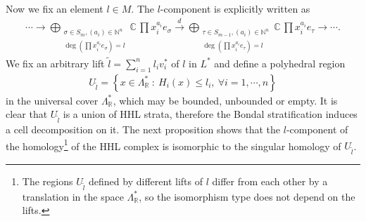 \documentclass[11pt,reqno]{amsart}
\def\C {{\mathbb C}}
\def\R {{\mathbb R}}
\theoremstyle{definition}
\numberwithin{equation}{section}
\begin{document}
Now we fix an element $l\in M$. The $l$-component is explicitly written as
\begin{align}\label{eq-l-complex}
    \cdots\rightarrow\bigoplus_{\substack{ \sigma\in S_m, (a_i)\in\mathbb{N}^n \\ \deg(\prod x_i^{a_i} e_{\sigma}) = l}} \C \, \prod x_i^{a_i} e_{\sigma} \xrightarrow{d} \bigoplus_{\substack{ \tau\in S_{m-1}, (a_i)\in\mathbb{N}^n\\ \deg(\prod x_i^{a_i} e_{\tau}) = l}} \C \, \prod x_i^{a_i} e_{\tau}\rightarrow\cdots.
\end{align}
We fix an arbitrary lift $\widetilde{l} = \sum_{i=1}^n l_i v_i^*$ of $l$ in $L^*$ and define a polyhedral region 
\begin{align*}
    U_{\widetilde{l}} = \left\{ x\in \Lambda^*_{\R}\ :\ H_i(x) \leq l_i,\ \forall i=1,\cdots,n\right\}
\end{align*}
in the universal cover $\Lambda^*_{\R}$, which may be bounded, unbounded or empty. It is clear that $U_{\widetilde{l}}$ is a union of HHL strata, therefore the Bondal stratification induces a cell decomposition on it. The next proposition shows that the $l$-component of the homology\footnote{The regions $U_{\widetilde{l}}$ defined by different lifts of $l$ differ from each other by a translation in the space $\Lambda^*_{\R}$, so the isomorphism type does not depend on the lifts.} of the HHL complex is isomorphic to the singular homology of $U_{\widetilde{l}}$.
\end{document}

